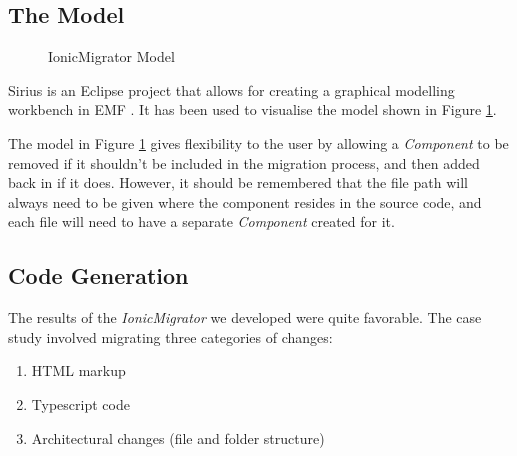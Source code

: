 \documentclass[conference]{IEEEtran}
\begin{document}
\subsection{The Model}
\begin{figure}[H]
\caption{IonicMigrator Model}
\label{fig:model}
\end{figure}

Sirius is an Eclipse project that allows for creating a graphical modelling workbench in EMF \cite{b12}. It has been used to visualise the model shown in Figure \ref{fig:model}.

The model in Figure \ref{fig:model} gives flexibility to the user by allowing a \textit{Component} to be removed if it shouldn’t be included in the migration process, and then added back in if it does. However, it should be remembered that the file path will always need to be given where the component resides in the source code, and each file will need to have a separate \textit{Component} created for it.

\subsection{Code Generation}
The results of the \textit{IonicMigrator} we developed were quite favorable. The case study
involved migrating three categories of changes:
\begin{enumerate}
    \item HTML markup
    \item Typescript code
    \item Architectural changes (file and folder structure)
\end{enumerate}
\end{document}
